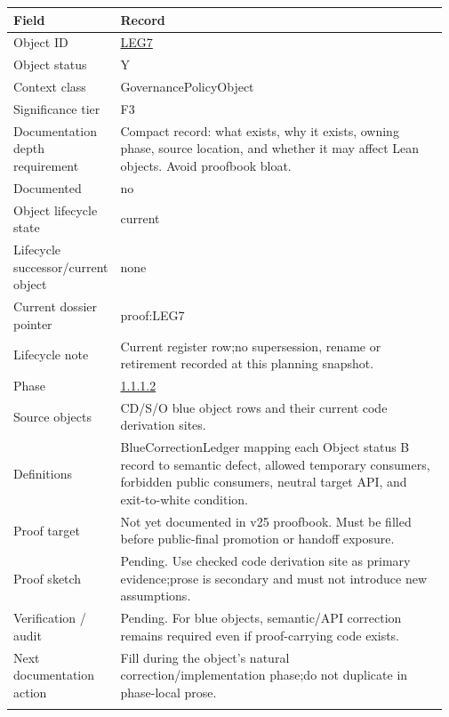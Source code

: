 \begin{longtable}{L{0.16\linewidth} L{0.81\linewidth}}
\hline
\textbf{Field} & \textbf{Record}\\
\hline
Object ID & \hyperlink{object-row-LEG7}{LEG7}\\
\hline\addlinespace[0.20em]
Object status & Y\\
\hline\addlinespace[0.20em]
Context class & GovernancePolicyObject\\
\hline\addlinespace[0.20em]
Significance tier & F3\\
\hline\addlinespace[0.20em]
Documentation depth requirement & Compact record: what exists, why it exists, owning phase, source location, and whether it may affect Lean objects. Avoid proofbook bloat.\\
\hline\addlinespace[0.20em]
Documented & no\\
\hline\addlinespace[0.20em]
Object lifecycle state & current\\
\hline\addlinespace[0.20em]
Lifecycle successor/\allowbreak{}current object & none\\
\hline\addlinespace[0.20em]
Current dossier pointer & proof:LEG7\\
\hline\addlinespace[0.20em]
Lifecycle note & Current register row;\newline no supersession, rename or retirement recorded at this planning snapshot.\\
\hline\addlinespace[0.20em]
Phase & \hyperlink{phase-row-1-1-1-2}{1.1.1.2}\\
\hline\addlinespace[0.20em]
Source objects & CD/\allowbreak{}S/\allowbreak{}O blue object rows and their current code derivation sites.\\
\hline\addlinespace[0.20em]
Definitions & BlueCorrectionLedger mapping each Object status B record to semantic defect, allowed temporary consumers, forbidden public consumers, neutral target API, and exit-to-white condition.\\
\hline\addlinespace[0.20em]
Proof target & Not yet documented in v25 proofbook. Must be filled before public-final promotion or handoff exposure.\\
\hline\addlinespace[0.20em]
Proof sketch & Pending. Use checked code derivation site as primary evidence;\newline prose is secondary and must not introduce new assumptions.\\
\hline\addlinespace[0.20em]
Verification /\allowbreak{} audit & Pending. For blue objects, semantic/\allowbreak{}API correction remains required even if proof-carrying code exists.\\
\hline\addlinespace[0.20em]
Next documentation action & Fill during the object's natural correction/\allowbreak{}implementation phase;\newline do not duplicate in phase-local prose.\\
\hline\addlinespace[0.20em]
\end{longtable}
